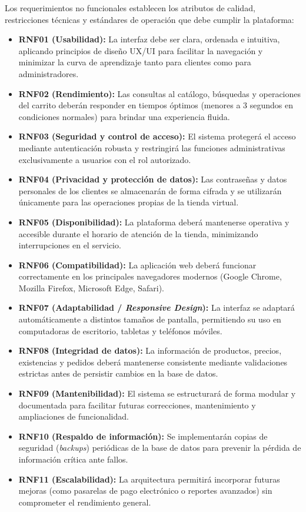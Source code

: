 Los requerimientos no funcionales establecen los atributos de calidad, restricciones técnicas y estándares de operación que debe cumplir la plataforma:

\begin{itemize}
    \item \textbf{RNF01 (Usabilidad):} La interfaz debe ser clara, ordenada e intuitiva, aplicando principios de diseño UX/UI para facilitar la navegación y minimizar la curva de aprendizaje tanto para clientes como para administradores.
    \item \textbf{RNF02 (Rendimiento):} Las consultas al catálogo, búsquedas y operaciones del carrito deberán responder en tiempos óptimos (menores a 3 segundos en condiciones normales) para brindar una experiencia fluida.
    \item \textbf{RNF03 (Seguridad y control de acceso):} El sistema protegerá el acceso mediante autenticación robusta y restringirá las funciones administrativas exclusivamente a usuarios con el rol autorizado.
    \item \textbf{RNF04 (Privacidad y protección de datos):} Las contraseñas y datos personales de los clientes se almacenarán de forma cifrada y se utilizarán únicamente para las operaciones propias de la tienda virtual.
    \item \textbf{RNF05 (Disponibilidad):} La plataforma deberá mantenerse operativa y accesible durante el horario de atención de la tienda, minimizando interrupciones en el servicio.
    \item \textbf{RNF06 (Compatibilidad):} La aplicación web deberá funcionar correctamente en los principales navegadores modernos (Google Chrome, Mozilla Firefox, Microsoft Edge, Safari).
    \item \textbf{RNF07 (Adaptabilidad / \textit{Responsive Design}):} La interfaz se adaptará automáticamente a distintos tamaños de pantalla, permitiendo su uso en computadoras de escritorio, tabletas y teléfonos móviles.
    \item \textbf{RNF08 (Integridad de datos):} La información de productos, precios, existencias y pedidos deberá mantenerse consistente mediante validaciones estrictas antes de persistir cambios en la base de datos.
    \item \textbf{RNF09 (Mantenibilidad):} El sistema se estructurará de forma modular y documentada para facilitar futuras correcciones, mantenimiento y ampliaciones de funcionalidad.
    \item \textbf{RNF10 (Respaldo de información):} Se implementarán copias de seguridad (\textit{backups}) periódicas de la base de datos para prevenir la pérdida de información crítica ante fallos.
    \item \textbf{RNF11 (Escalabilidad):} La arquitectura permitirá incorporar futuras mejoras (como pasarelas de pago electrónico o reportes avanzados) sin comprometer el rendimiento general.
\end{itemize}

